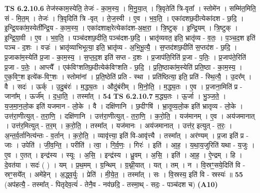 \documentclass[17pt]{extarticle}
\begin{document}
                  \newline
                                \textbf{ TS 6.2.10.6} \newline
                  तेज॑स्काम॒स्येति॒ तेजः॑ - का॒म॒स्य॒ । मि॒नु॒या॒त् । त्रि॒वृतेति॑ त्रि-वृता᳚ । स्तोमे॑न । सम्मि॑त॒मिति॒ सं - मि॒त॒म् । तेजः॑ । त्रि॒वृदिति॑ त्रि -वृत् । ते॒ज॒स्वी । ए॒व । भ॒व॒ति॒ । एका॑दशछ॒दीत्येका॑दश - छ॒दि॒ । इ॒न्द्रि॒यका॑म॒स्येती᳚न्द्रि॒य - का॒म॒स्य॒ । एका॑दशाक्ष॒रेत्येका॑दश-अ॒क्ष॒रा॒ । त्रि॒ष्टुक् । इ॒न्द्रि॒यम् । त्रि॒ष्टुक् । इ॒न्द्रि॒या॒वी । ए॒व । भ॒व॒ति॒ । पञ्च॑दशछ॒दीति॒ पञ्च॑दश-छ॒दि॒ । भ्रातृ॑व्यवत॒ इति॒ भ्रातृ॑व्य - व॒तः॒ । प॒ञ्च॒द॒श इति॑ पञ्च - द॒शः । वज्रः॑ । भ्रातृ॑व्याभिभूत्या॒ इति॒ भ्रातृ॑व्य - अ॒भि॒भू॒त्यै॒ । स॒प्तद॑शछ॒दीति॑ स॒प्तद॑श - छ॒दि॒ । प्र॒जाका॑म॒स्येति॑ प्र॒जा - का॒म॒स्य॒ । स॒प्त॒द॒श इति॑ सप्त - द॒शः । प्र॒जाप॑ति॒रिति॑ प्र॒जा - प॒तिः॒ । प्र॒जाप॑ते॒रिति॑ प्र॒जा - प॒तेः॒ । आप्त्यै᳚ । एक॑विꣳशतिछ॒दीत्येक॑विꣳशति - छ॒दि॒ । प्र॒ति॒ष्ठाका॑म॒स्येति॑ प्रति॒ष्ठा - का॒म॒स्य॒ । ए॒क॒विꣳ॒॒श इत्ये॑क-विꣳ॒॒शः । स्तोमा॑नां । प्र॒ति॒ष्ठेति॑ प्रति - स्था । प्रति॑ष्ठित्या॒ इति॒ प्रति॑ - स्थि॒त्यै॒ । उ॒दर᳚म् । वै । सदः॑ । ऊर्क् । उ॒दु॒बंरः॑ । म॒द्ध्य॒तः । औदु॑बंरीम् । मि॒नो॒ति॒ । म॒द्ध्य॒तः । ए॒व । प्र॒जाना॒मिति॑ प्र - जाना᳚म् । ऊर्ज᳚म् । द॒धा॒ति॒ । तस्मा᳚त् । \textbf{  54} \newline
                  \newline
                                \textbf{ TS 6.2.10.7} \newline
                  म॒द्ध्य॒तः । ऊ॒र्जा । भु॒ञ्ज॒ते॒ । य॒ज॒मा॒न॒लो॒क इति॑ यजमान - लो॒के । वै । दक्षि॑णानि । छ॒दीꣳषि॑ । भ्रा॒तृ॒व्य॒लो॒क इति॑ भ्रातृव्य - लो॒के । उत्त॑रा॒णीत्युत् - त॒रा॒णि॒ । दक्षि॑णानि । उत्त॑रा॒णीत्युत् - त॒रा॒णि॒ । क॒रो॒ति॒ । यज॑मानम् । ए॒व । अय॑जमानात् । उत्त॑र॒मित्युत् - त॒र॒म् । क॒रो॒ति॒ । तस्मा᳚त् । यज॑मानः । अय॑जमानात् । उत्त॑र॒ इत्युत् - त॒रः॒ । अ॒न्त॒र्व॒र्तानित्य॑न्तः - व॒र्तान् । क॒रो॒ति॒ । व्यावृ॑त्त्या॒ इति॑ वि-आवृ॑त्त्यै । तस्मा᳚त् । अर॑ण्यम् । प्र॒जा इति॑ प्र - जाः । उपेति॑ । जी॒व॒न्ति॒ । परीति॑ । त्वा॒ । गि॒र्व॒णः॒ । गिरः॑ । इति॑ । आ॒ह॒ । य॒था॒य॒जुरिति॑ यथा - य॒जुः । ए॒व । ए॒तत् । इन्द्र॑स्य । स्यूः । अ॒सि॒ । इन्द्र॑स्य । ध्रु॒वम् । अ॒सि॒ । इति॑ । आ॒ह॒ । ऐ॒न्द्रम् । हि । दे॒वत॑या । सदः॑ ( ) । यम् । प्र॒थ॒मम् । ग्र॒न्थिम् । ग्र॒थ्नी॒यात् । यत् । तम् । न । वि॒स्रꣳ॒॒सये॒दिति॑ वि - स्रꣳ॒॒सये᳚त् । अमे॑हेन् । अ॒द्ध्व॒र्युः । प्रेति॑ । मी॒ये॒त॒ । तस्मा᳚त् । सः । वि॒स्रस्य॒ इति॑ वि - स्रस्यः॑ ॥ \textbf{  55} \newline
                  \newline
                      (अप॑हत्यै॒ - तस्मा᳚त् - पितृदेव॒त्यं॑ - तेनै॒व - नव॑छदि॒ - तस्मा॒थ् - सदः॒ - पञ्च॑दश च)  \textbf{(A10)} \newline \newline
\end{document}
